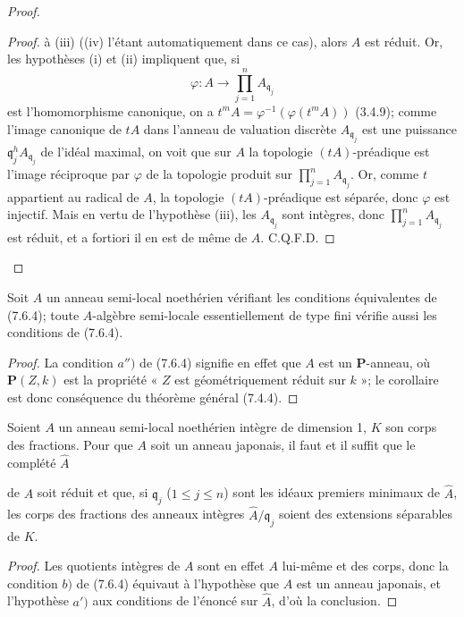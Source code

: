\begin{proof}
\begin{proof}
à (iii) ((iv) l'étant automatiquement dans ce cas), alors $A$ est réduit. Or,
les hypothèses (i) et (ii) impliquent que, si
\[
\varphi:A\longrightarrow\prod_{j=1}^nA_{\mathfrak q_j}
\]
est l'homomorphisme canonique, on a
$t^mA=\varphi^{-1}(\varphi(t^mA))$ (3.4.9); comme l'image canonique de $tA$
dans l'anneau de valuation discrète $A_{\mathfrak q_j}$ est une puissance
$\mathfrak q_j^hA_{\mathfrak q_j}$ de l'idéal maximal, on voit que sur $A$ la
topologie $(tA)$-préadique est l'image réciproque par $\varphi$ de la topologie
produit sur $\prod_{j=1}^nA_{\mathfrak q_j}$. Or, comme $t$ appartient au
radical de $A$, la topologie $(tA)$-préadique est séparée, donc $\varphi$ est
injectif. Mais en vertu de l'hypothèse (iii), les $A_{\mathfrak q_j}$ sont
intègres, donc $\prod_{j=1}^nA_{\mathfrak q_j}$ est réduit, et a fortiori il en
est de même de $A$. C.Q.F.D.
\end{proof}
\end{proof}

\begin{corollary}[7.6.5]
\label{IV.2.s7.6.5-fr}
Soit $A$ un anneau semi-local noethérien vérifiant les conditions équivalentes
de (7.6.4); toute $A$-algèbre semi-locale essentiellement de type fini vérifie
aussi les conditions de (7.6.4).
\end{corollary}

\begin{proof}
La condition $a'')$ de (7.6.4) signifie en effet que $A$ est un
$\boldsymbol P$-anneau, où $\boldsymbol P(Z,k)$ est la propriété « $Z$ est
géométriquement réduit sur $k$ »; le corollaire est donc conséquence du
théorème général (7.4.4).
\end{proof}

\begin{corollary}[7.6.6]
\label{IV.2.s7.6.6-fr}
Soient $A$ un anneau semi-local noethérien intègre de dimension 1, $K$ son
corps des fractions. Pour que $A$ soit un anneau japonais, il faut et il suffit
que le complété $\widehat A$


de $A$ soit réduit et que, si $\mathfrak q_j$ ($1\leq j\leq n$) sont les
idéaux premiers minimaux de $\widehat A$, les corps des fractions des anneaux
intègres $\widehat A/\mathfrak q_j$ soient des extensions séparables de $K$.
\end{corollary}

\begin{proof}
Les quotients intègres de $A$ sont en effet $A$ lui-même et des corps, donc la
condition $b)$ de (7.6.4) équivaut à l'hypothèse que $A$ est un anneau
japonais, et l'hypothèse $a')$ aux conditions de l'énoncé sur $\widehat A$,
d'où la conclusion.
\end{proof}

